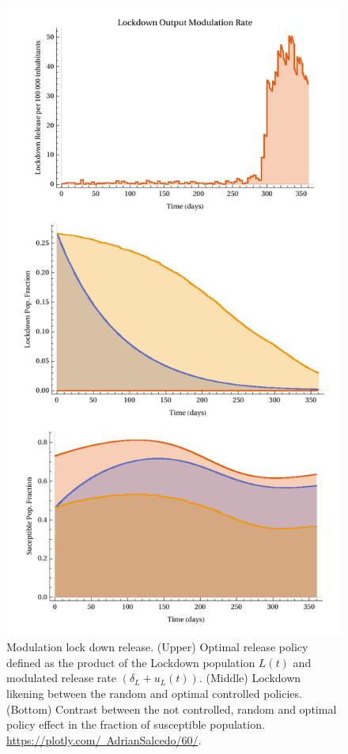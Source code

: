 \begin{figure}[tbh]
    \centering
    \includegraphics[scale=0.65, keepaspectratio]{figs/LockdownEffect}
    \caption{
        Modulation lock down release.
        (Upper) Optimal release policy defined as the product of the Lockdown
        population $L(t)$ and modulated release rate $(\delta_L + u_L(t))$.
        (Middle) Lockdown likening between the random and optimal controlled
        policies.
        (Bottom) Contrast between the not controlled, random  and optimal
        policy effect in the fraction of susceptible population.
        \href{https://plotly.com/~AdrianSalcedo/60/}{%
            https://plotly.com/~AdrianSalcedo/60/}.
    }
    \label{fig:lockdowneffect}
\end{figure}

